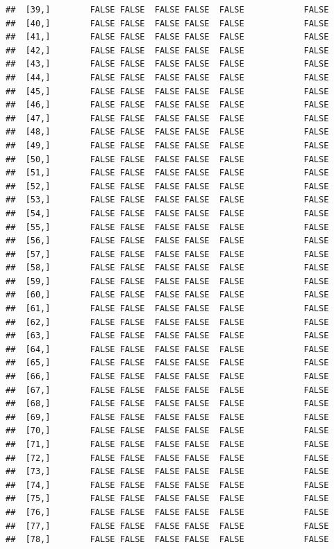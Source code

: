 \documentclass[
  english,
  man,floatsintext]{apa6}
\begin{document}
\begin{verbatim}
##  [39,]        FALSE FALSE  FALSE FALSE  FALSE            FALSE
##  [40,]        FALSE FALSE  FALSE FALSE  FALSE            FALSE
##  [41,]        FALSE FALSE  FALSE FALSE  FALSE            FALSE
##  [42,]        FALSE FALSE  FALSE FALSE  FALSE            FALSE
##  [43,]        FALSE FALSE  FALSE FALSE  FALSE            FALSE
##  [44,]        FALSE FALSE  FALSE FALSE  FALSE            FALSE
##  [45,]        FALSE FALSE  FALSE FALSE  FALSE            FALSE
##  [46,]        FALSE FALSE  FALSE FALSE  FALSE            FALSE
##  [47,]        FALSE FALSE  FALSE FALSE  FALSE            FALSE
##  [48,]        FALSE FALSE  FALSE FALSE  FALSE            FALSE
##  [49,]        FALSE FALSE  FALSE FALSE  FALSE            FALSE
##  [50,]        FALSE FALSE  FALSE FALSE  FALSE            FALSE
##  [51,]        FALSE FALSE  FALSE FALSE  FALSE            FALSE
##  [52,]        FALSE FALSE  FALSE FALSE  FALSE            FALSE
##  [53,]        FALSE FALSE  FALSE FALSE  FALSE            FALSE
##  [54,]        FALSE FALSE  FALSE FALSE  FALSE            FALSE
##  [55,]        FALSE FALSE  FALSE FALSE  FALSE            FALSE
##  [56,]        FALSE FALSE  FALSE FALSE  FALSE            FALSE
##  [57,]        FALSE FALSE  FALSE FALSE  FALSE            FALSE
##  [58,]        FALSE FALSE  FALSE FALSE  FALSE            FALSE
##  [59,]        FALSE FALSE  FALSE FALSE  FALSE            FALSE
##  [60,]        FALSE FALSE  FALSE FALSE  FALSE            FALSE
##  [61,]        FALSE FALSE  FALSE FALSE  FALSE            FALSE
##  [62,]        FALSE FALSE  FALSE FALSE  FALSE            FALSE
##  [63,]        FALSE FALSE  FALSE FALSE  FALSE            FALSE
##  [64,]        FALSE FALSE  FALSE FALSE  FALSE            FALSE
##  [65,]        FALSE FALSE  FALSE FALSE  FALSE            FALSE
##  [66,]        FALSE FALSE  FALSE FALSE  FALSE            FALSE
##  [67,]        FALSE FALSE  FALSE FALSE  FALSE            FALSE
##  [68,]        FALSE FALSE  FALSE FALSE  FALSE            FALSE
##  [69,]        FALSE FALSE  FALSE FALSE  FALSE            FALSE
##  [70,]        FALSE FALSE  FALSE FALSE  FALSE            FALSE
##  [71,]        FALSE FALSE  FALSE FALSE  FALSE            FALSE
##  [72,]        FALSE FALSE  FALSE FALSE  FALSE            FALSE
##  [73,]        FALSE FALSE  FALSE FALSE  FALSE            FALSE
##  [74,]        FALSE FALSE  FALSE FALSE  FALSE            FALSE
##  [75,]        FALSE FALSE  FALSE FALSE  FALSE            FALSE
##  [76,]        FALSE FALSE  FALSE FALSE  FALSE            FALSE
##  [77,]        FALSE FALSE  FALSE FALSE  FALSE            FALSE
##  [78,]        FALSE FALSE  FALSE FALSE  FALSE            FALSE

\end{verbatim}
\end{document}
